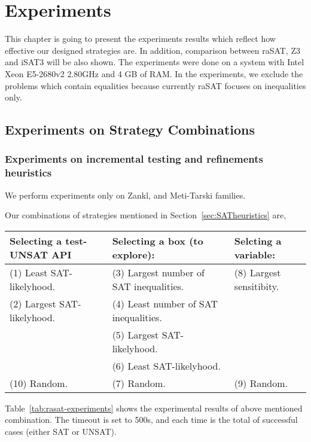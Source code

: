 \chapter{Experiments} \label{chap:experiments}
This chapter is going to present the experiments results which reflect how effective our designed strategies are. In addition, comparison between raSAT, Z3 and iSAT3 will be also shown. The experiments were done on a system with  Intel Xeon E5-2680v2 2.80GHz and 4 GB of RAM. In the experiments, we exclude the problems which contain equalities because currently raSAT focuses on inequalities only.

\section{Experiments on Strategy Combinations} \label{sec:expstrategy}
\subsection*{Experiments on incremental testing and refinements heuristics}
We perform experiments only on Zankl, and Meti-Tarski families. 


Our combinations of strategies mentioned in Section~\ref{sec:SATheuristics} are, 

\medskip
{\centering
\begin{tabular}{l|l|l}
Selecting a test-UNSAT API~~ & Selecting a box (to explore): & 
Selcting a variable: \\  %
\hline

(1) Least SAT-likelyhood. & 
(3) Largest number of SAT inequalities.~~ & 
(8) Largest sensitibity. \\

(2) Largest SAT-likelyhood. & 
(4) Least number of SAT inequalities. & \\

& (5) Largest SAT-likelyhood. & \\

& (6) Least SAT-likelyhood. & \\

(10) Random. & (7) Random. & (9) Random. \\
\end{tabular}
}
\medskip

Table~\ref{tab:rasat-experiments} shows the experimental results of above mentioned combination. 
The timeout is set to 500s, and each time is the total of successful cases 
(either SAT or UNSAT). 

